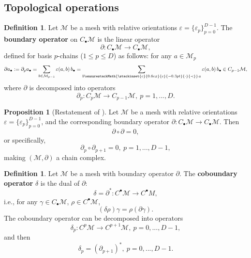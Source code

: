 \documentclass{elsarticle}
\theoremstyle{definition}
\newtheorem{proposition}[theorem]{Proposition}
\newtheorem{definition}[theorem]{Definition}
\newcommand{\precdot}{%
  \mathrel{%
    \ensurestackMath{%
      \stackinset{c}{0.6ex}{c}{-0.3pt}{\cdot}{\prec}%
    }%
  }%
}
\newcommand{\newterm}[1]{\textbf{#1}}
\begin{document}
\subsection{Topological operations}
\label{sec:combinatorial/topological}
\begin{definition}
  Let $\mathcal{M}$ be a mesh with relative orientations $\varepsilon = \{\varepsilon_p\}_{p = 0}^{D - 1}$.
  The \newterm{boundary operator} on $C_\bullet \mathcal{M}$ is the linear operator
  \begin{equation}
    \partial \colon C_\bullet \mathcal{M} \to C_\bullet \mathcal{M},
  \end{equation}
  defined for basis $p$-chains ($1 \leq p \leq D$) as follows: for any $a \in \mathcal{M}_p$
  \begin{equation}
    \partial a_\bullet
    := \partial_p a_\bullet
    = \sum_{b \in \mathcal{M}_{p - 1}} \varepsilon(a, b)\, b_\bullet
    = \sum_{b \precdot\, a} \varepsilon(a, b)\, b_\bullet
    \in C_{p - 1} \mathcal{M},
  \end{equation}
  where $\partial$ is decomposed into operators
  \begin{equation}
    \partial_p \colon C_p \mathcal{M} \to C_{p - 1} \mathcal{M},\ p = 1, ..., D.
  \end{equation}
\end{definition}
\begin{proposition}[Restatement of ]
  Let $\mathcal{M}$ be a mesh with relative orientations
  $\varepsilon = \{\varepsilon_p\}_{p = 0}^{D - 1}$,
  and the corresponding boundary operator
  $\partial \colon C_\bullet \mathcal{M} \to C_\bullet \mathcal{M}$.
  Then
  \begin{equation}
    \partial \circ \partial = 0,
  \end{equation}
  or specifically,
  \begin{equation}
    \partial_p \circ \partial_{p + 1} = 0,\ p = 1, ..., D - 1,
  \end{equation}
  making $(\mathcal{M}, \partial)$ a chain complex.
\end{proposition}
\begin{definition}
  Let $\mathcal{M}$ be a mesh with boundary operator $\partial$.
  The \newterm{coboundary operator} $\delta$ is the dual of $\partial$:
  \begin{equation}
    \delta = \partial^* \colon C^\bullet \mathcal{M} \to C^\bullet M,
  \end{equation}
  i.e., for any $\gamma \in C_\bullet \mathcal{M}$, $\rho \in C^\bullet \mathcal{M}$,
  \begin{equation}
    (\delta \rho) \gamma = \rho(\partial \gamma).
  \end{equation}
  The coboundary operator can be decomposed into operators
  \begin{equation}
    \delta_p \colon C^p \mathcal{M} \to C^{p + 1} \mathcal{M},\ p = 0, ..., D - 1,
  \end{equation}
  and then
  \begin{equation}
    \delta_p = (\partial_{p + 1})^*,\ p = 0, ..., D - 1.
  \end{equation}
\end{definition}
\end{document}
